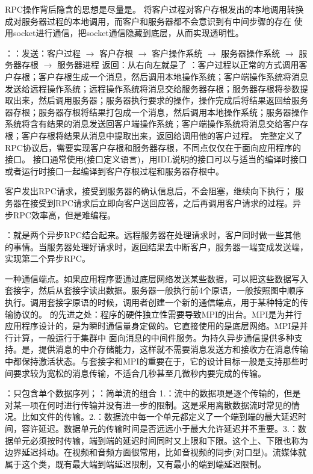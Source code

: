 \documentclass[twoside]{ctexart}
\begin{document}
\begin{multicols}{2}
   RPC操作背后隐含的思想是尽量是。 将客户过程对客户存根发出的本地调用转换成对服务器过程的本地调用，而客户和服务器都不会意识到有中间步骤的存在 使用socket进行通信，把socket通信隐藏到底层，从而实现透明性。

  ：：发送：客户过程 $\to$ 客户存根 $\to$ 客户操作系统 $\to$ 服务器操作系统 $\to$ 服务器存根 $\to$ 服务器进程 返回：从右向左就是了 ：客户过程以正常的方式调用客户存根；客户存根生成一个消息，然后调用本地操作系统；客户端操作系统将消息发送给远程操作系统；远程操作系统将消息交给服务器存根；服务器存根将参数提取出来，然后调用服务器；服务器执行要求的操作，操作完成后将结果返回给服务器存根；服务器存根将结果打包成一个消息，然后调用本地操作系统；服务器操作系统将含有结果的消息发送回客户端操作系统；客户端操作系统将消息交给客户存根；客户存根将结果从消息中提取出来，返回给调用他的客户过程。 完整定义了RPC协议后，需要实现客户存根和服务器存根，不同点仅仅在于面向应用程序的接口。 接口通常使用(接口定义语言)，用IDL说明的接口可以与适当的编译时接口或者运行时接口一起编译到客户存根过程和服务器存根中。

    客户发出RPC请求，接受到服务器的确认信息后，不会阻塞，继续向下执行； 服务器在接受到RPC请求后立即向客户送回应答，之后再调用客户请求的过程。异步RPC效率高，但是难编程。

  ：就是两个异步RPC结合起来。远程服务器在处理请求时，客户同时做一些其他的事情。当服务器处理好请求时，返回结果去中断客户，服务器一端变成发送端，实现第二个异步RPC。

    一种通信端点。如果应用程序要通过底层网络发送某些数据，可以把这些数据写入套接字，然后从套接字读出数据。服务器一般执行前4个原语，一般按照图中顺序执行。调用套接字原语的时候，调用者创建一个新的通信端点，用于某种特定的传输协议的。  的先进之处：程序的硬件独立性需要导致MPI的出台。MPI是为并行应用程序设计的，是为瞬时通信量身定做的。它直接使用的是底层网络。MPI是并行计算，一般运行于集群中  面向消息的中间件服务。为持久异步通信提供多种支持。是，提供消息的中介存储能力，这样就不需要消息发送方和接收方在消息传输中都保持激活状态。与套接字和MPI的重要在于，它的设计目标一般是支持那些时间要求较为宽松的消息传输，不适合几秒甚至几微秒内要完成的传输。

   ：只包含单个数据序列；：简单流的组合  1.：流中的数据项是逐个传输的，但是对某一项在何时进行传输并没有进一步的限制。这是采用离散数据流时常见的情况。比如文件的传输。2.：数据流中每一个单元都定义了一个端到端的最大延迟时间，容许延迟。数据单元的传输时间是否远远小于最大允许延迟并不重要。3.：数据单元必须按时传输，端到端的延迟时间同时又上限和下限。这个上、下限也称为边界延迟抖动。在视频和音频方面很常用，比如音视频的同步(对口型)。流媒体就属于这个类，既有最大端到端延迟限制，又有最小的端到端延迟限制。


\end{multicols}
\end{document}
